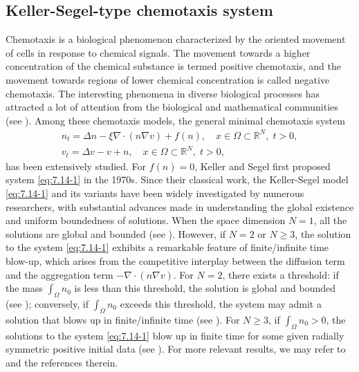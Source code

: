 \documentclass[10pt,a4paper]{amsart}
\numberwithin{equation}{section}
\begin{document}
\subsection*{Keller-Segel-type chemotaxis system}  
Chemotaxis is a biological phenomenon characterized by the oriented movement of 
cells in response to chemical signals. The movement towards a higher concentration of 
the chemical substance is termed positive chemotaxis, and the movement towards regions 
of lower chemical concentration is called negative chemotaxis.
The interesting phenomena in diverse biological processes has attracted a lot of 
attention from the biological and mathematical communities  (see \cite{Hillen}). 
Among these chemotaxis models, the general minimal chemotaxis system
 \begin{equation}\label{eq:7.14-1}
\begin{gathered}
n_t = \Delta n - \xi \nabla \cdot (n \nabla v)+f(n), \quad
 x \in \Omega\subset \mathbb{R}^N,\; t > 0, \\
v_t = \Delta v  - v+ n , \quad x \in \Omega\subset \mathbb{R}^N,\; t > 0,
\end{gathered}
\end{equation}
has been extensively studied. 
For $f(n)= 0$, Keller and Segel  \cite{Keller-1970,Keller-1970-2} first proposed 
system \eqref{eq:7.14-1} in the 1970s. 
Since their classical work, the Keller-Segel model \eqref{eq:7.14-1} and its variants 
have been widely investigated by numerous researchers, with substantial advances made 
in understanding the global existence and uniform boundedness of solutions.
When the space dimension $ N = 1 $, all the solutions are global and bounded 
(see \cite{Osaki-2001}). However, if $ N=2$ or $ N \geq 3 $, the solution to the system 
\eqref{eq:7.14-1} exhibits a remarkable feature of finite/infinite time blow-up, 
which arises from the competitive interplay between the diffusion term and the 
aggregation term $-\nabla \cdot (n \nabla v)$. For $ N = 2 $, there exists a threshold: 
if the mass $\int_\Omega n_0$ is less than this threshold, the solution is global and 
bounded (see \cite{G-3, G-4}); conversely, if $\int_\Omega n_0$ exceeds this threshold, 
the system may admit a solution that blows up in finite/infinite time (see \cite{G-5, G-6}). For $N \geq 3$, if $\int_\Omega n_0 > 0$, the solutions to the system \eqref{eq:7.14-1} blow up in finite time for some given radially symmetric positive initial data (see \cite{Herrero-1997, Dolbeault-2004, Nagai}). For more relevant results, we may refer to \cite{G-8, G-9, G-10} and the references therein.
\end{document}
